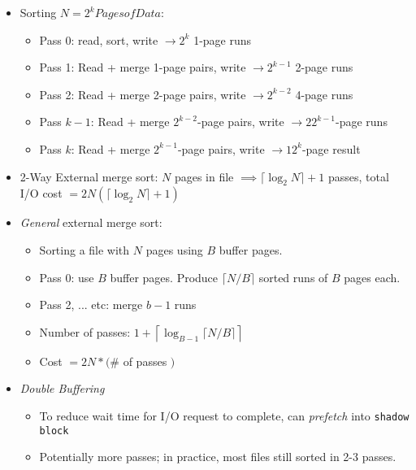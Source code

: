 \documentclass[landscape,8pt]{extarticle}
\newcommand{\code}{\lstinline}
\begin{document}
\begin{multicols}{5}
\begin{itemize}
\begin{itemize}
                  \item Sorting $N=2^k Pages of Data$:
                        \begin{itemize}
                            \item Pass 0: read, sort, write $\rightarrow 2^k$ 1-page runs
                            \item Pass 1: Read + merge 1-page pairs, write $\rightarrow 2^{k-1}$ 2-page runs
                            \item Pass 2: Read + merge 2-page pairs, write $\rightarrow 2^{k-2}$ 4-page runs
                            \item Pass $k-1$: Read + merge $2^{k-2}$-page pairs, write $\rightarrow 2 2^{k-1}$-page runs
                            \item Pass $k$: Read + merge $2^{k-1}$-page pairs, write $\rightarrow 1 2^k$-page result
                        \end{itemize}
                  \item 2-Way External merge sort: $N$ pages in file $\implies \lceil \log_2 N \rceil + 1$ passes, total I/O cost $= 2 N \left ( \lceil \log_2 N \rceil + 1 \right )$
                  \item \emph{General} external merge sort:
                        \begin{itemize}
                            \item Sorting a file with $N$ pages using $B$ buffer pages.
                            \item Pass 0: use $B$ buffer pages. Produce $\lceil N / B \rceil$ sorted runs of $B$ pages each.
                            \item Pass 2, ... etc: merge $b - 1$ runs
                            \item Number of passes: $1 + \left \lceil \log_{B-1} \lceil N / B \rceil \right \rceil $
                            \item Cost $= 2N * ($\# of passes $)$
                        \end{itemize}
                  \item \emph{Double Buffering}
                        \begin{itemize}
                            \item To reduce wait time for I/O request to complete, can \emph{prefetch} into \code{shadow block}
                            \item Potentially more passes; in practice, most files still sorted in 2-3 passes.

\end{itemize}
\end{itemize}
\end{itemize}
\end{multicols}
\end{document}
